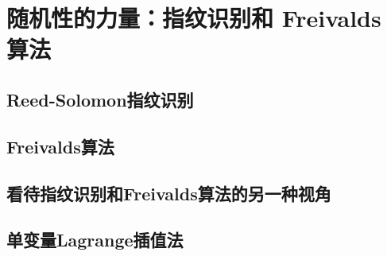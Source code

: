 \chapter{随机性的力量：指纹识别和 Freivalds 算法}\label{chp:02Randomness}

\section{Reed-Solomon指纹识别}\label{2.1}
\section{Freivalds算法}\label{2.2}
\section{看待指纹识别和Freivalds算法的另一种视角}\label{2.3}
\section{单变量Lagrange插值法}\label{2.4}